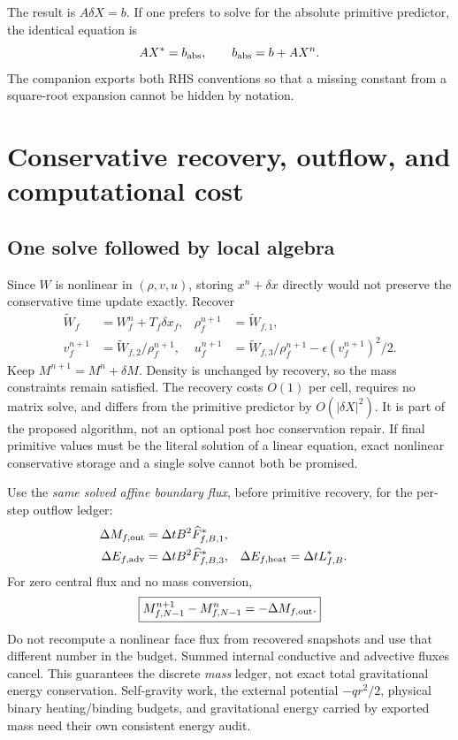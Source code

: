 \documentclass[11pt]{article}
\begin{document}
The result is $A\delta X=b$. If one prefers to solve for the absolute
primitive predictor, the identical equation is
\begin{equation}
 AX^*=b_{\rm abs},\qquad b_{\rm abs}=b+AX^n.
\end{equation}
The companion exports both RHS conventions so that a missing constant
from a square-root expansion cannot be hidden by notation.

\section{Conservative recovery, outflow, and computational cost}
\subsection{One solve followed by local algebra}
Since $W$ is nonlinear in $(\rho,v,u)$, storing $x^n+\delta x$ directly
would not preserve the conservative time update exactly. Recover
\begin{align}
 \widetilde W_f&=W_f^n+T_f\delta x_f,&
 \rho_f^{n+1}&=\widetilde W_{f,1},\\
 v_f^{n+1}&=\widetilde W_{f,2}/\rho_f^{n+1},&
 u_f^{n+1}&=\widetilde W_{f,3}/\rho_f^{n+1}
                  -\epsilon(v_f^{n+1})^2/2.
 \label{eq:recovery}
\end{align}
Keep $M^{n+1}=M^n+\delta M$. Density is unchanged by recovery, so the
mass constraints remain satisfied. The recovery costs $O(1)$ per cell,
requires no matrix solve, and differs from the primitive predictor by
$O(|\delta X|^2)$. It is part of the proposed algorithm, not an optional
post hoc conservation repair. If final primitive values must be the
literal solution of a linear equation, exact nonlinear conservative
storage and a single solve cannot both be promised.

Use the \emph{same solved affine boundary flux}, before primitive
recovery, for the per-step outflow ledger:
\begin{align}
 \Delta M_{f,\rm out}&=\Delta t B^2\widehat F_{f,B,1}^*,\\
 \Delta E_{f,\rm adv}&=\Delta t B^2\widehat F_{f,B,3}^*,&
 \Delta E_{f,\rm heat}&=\Delta t L_{f,B}^*.
\end{align}
For zero central flux and no mass conversion,
\begin{equation}
 \boxed{M_{f,N-1}^{n+1}-M_{f,N-1}^n=-\Delta M_{f,\rm out}.}
\end{equation}
Do not recompute a nonlinear face flux from recovered snapshots and use
that different number in the budget. Summed internal conductive and
advective fluxes cancel. This guarantees the discrete \emph{mass} ledger,
not exact total gravitational energy conservation. Self-gravity work,
the external potential $-qr^2/2$, physical binary heating/binding budgets,
and gravitational energy carried by exported mass need their own
consistent energy audit.
\end{document}
